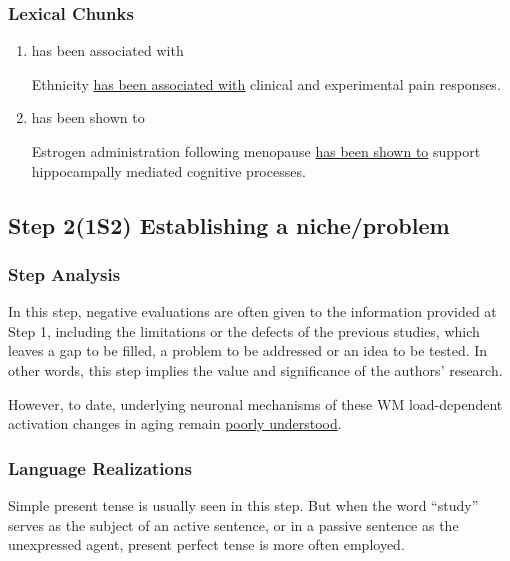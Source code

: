 \documentclass[a4paper]{ctexbook}
\begin{document}
    \subsubsection{Lexical Chunks}

    \begin{enumerate}
      \item has been associated with
      \begin{eg}[label={myautocounter}]{}
        Ethnicity \uline{has been associated with} clinical and experimental pain responses.
      \end{eg}

      \item has been shown to
      \begin{eg}[label={myautocounter}]{}
        Estrogen administration following menopause \uline{has been shown to} support hippocampally mediated cognitive processes.
      \end{eg}
    \end{enumerate}
  
  \subsection{Step 2(1S2) Establishing a niche/problem}

    \subsubsection{Step Analysis}

    In this step, negative evaluations are often given to the information provided at Step 1, including the limitations or the defects of the previous studies, which leaves a gap to be filled, a problem to be addressed or an idea to be tested. In other words, this step implies the value and significance of the authors' research.

    \begin{eg}{}
      However, to date, underlying neuronal mechanisms of these WM load-dependent activation changes in aging remain \uline{poorly understood}.
    \end{eg}

    \subsubsection{Language Realizations}

    Simple present tense is usually seen in this step. But when the word ``study'' serves as the subject of an active sentence, or in a passive sentence as the unexpressed agent, present perfect tense is more often employed.
\end{document}
